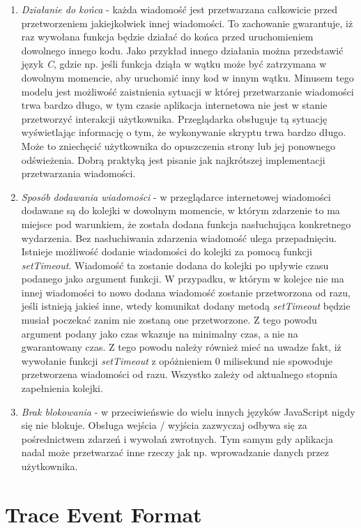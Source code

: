 \documentclass[polish, twoside, 12pt]{mwart}
\let\stdsection\section
\renewcommand*{\section}{\clearpage\stdsection}
\begin{document}
\begin{enumerate}
  \item \emph{Działanie do końca} - każda wiadomość jest przetwarzana całkowicie przed przetworzeniem jakiejkolwiek innej wiadomości. To zachowanie gwarantuje, iż raz wywołana funkcja będzie działać do końca przed uruchomieniem dowolnego innego kodu. Jako przykład innego działania można przedstawić język \emph{C}, gdzie np. jeśli funkcja dziąła w wątku może być zatrzymana w dowolnym momencie, aby uruchomić inny kod w innym wątku. Minusem tego modelu jest możliwość zaistnienia sytuacji w której przetwarzanie wiadomości trwa bardzo długo, w tym czasie aplikacja internetowa nie jest w stanie przetworzyć interakcji użytkownika. Przeglądarka obsługuje tą sytuację wyświetlając informację o tym, że wykonywanie skryptu trwa bardzo długo. Może to zniechęcić użytkownika do opuszczenia strony lub jej ponownego odświeżenia. Dobrą praktyką jest pisanie jak najkrótszej implementacji przetwarzania wiadomości.
  \item \emph{Sposób dodawania wiadomości} - w przeglądarce internetowej wiadomości dodawane są do kolejki w dowolnym momencie, w którym zdarzenie to ma miejsce pod warunkiem, że została dodana funkcja nasłuchująca konkretnego wydarzenia. Bez nasłuchiwania zdarzenia wiadomość ulega przepadnięciu. Istnieje możliwość dodanie wiadomości do kolejki za pomocą funkcji \emph{setTimeout}. Wiadomość ta zostanie dodana do kolejki po upływie czasu podanego jako argument funkcji. W przypadku, w którym w kolejce nie ma innej wiadomości to nowo dodana wiadomość zostanie przetworzona od razu, jeśli istnieją jakieś inne, wtedy komunikat dodany metodą \emph{setTimeout} będzie musiał poczekać zanim nie zostaną one przetworzone. Z tego powodu argument podany jako czas wkazuje na minimalny czas, a nie na gwarantowany czas. Z tego powodu należy również mieć na uwadze fakt, iż wywołanie funkcji \emph{setTimeout} z opóżnieniem 0 milisekund nie spowoduje przetworzena wiadomości od razu. Wszystko zależy od aktualnego stopnia zapełnienia kolejki.
  \item \emph{Brak blokowania} - w przeciwieńswie do wielu innych języków JavaScript nigdy się nie blokuje. Obsługa wejścia / wyjścia zazwyczaj odbywa się za pośrednictwem zdarzeń i wywołań zwrotnych. Tym samym gdy aplikacja nadal może przetwarzać inne rzeczy jak np. wprowadzanie danych przez użytkownika.
\end{enumerate}

\section{Trace Event Format} \label{trace-event-format-section}
\end{document}
